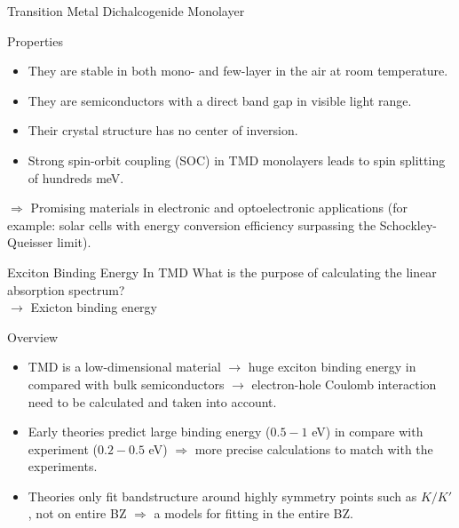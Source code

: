\documentclass{beamer}
\begin{document}
	\begin{frame}{Transition Metal Dichalcogenide Monolayer}
\begin{block}{Properties}
\begin{itemize}
\item They are stable in both mono- and few-layer in the air at room temperature. \\
\item They are semiconductors with a direct band gap in visible light range.
\item Their crystal structure has no center of inversion.\\
\item Strong spin-orbit coupling (SOC) in TMD monolayers leads to spin splitting of hundreds meV.
\end{itemize}
\end{block}
$\Rightarrow$ Promising materials in electronic and optoelectronic applications (for example: solar cells with energy conversion efficiency surpassing the Schockley-Queisser limit).
	\end{frame}
	\begin{frame}{Exciton Binding Energy In TMD}
		What is the purpose of calculating the linear absorption spectrum?\\ $\to$ Exicton binding energy
\begin{block}{Overview}
\begin{itemize}
\item TMD is a low-dimensional material $\to$ huge exciton binding energy in compared with bulk semiconductors $\to$ electron-hole Coulomb interaction need to be calculated and taken into account.
\item Early theories predict large binding energy ($0.5-1$ eV) in compare with experiment ($0.2-0.5$ eV) $\Rightarrow$ more precise calculations to match with the experiments.
\item Theories only fit bandstructure around highly symmetry points such as $K/K'$, not on entire BZ $\Rightarrow$ a models for fitting in the entire BZ.
		\end{itemize}
\end{block}
	\end{frame}
\end{document}
